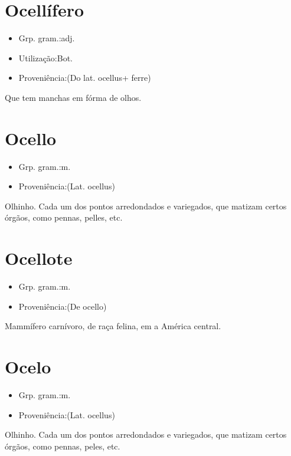\section{Ocellífero}
\begin{itemize}
\item {Grp. gram.:adj.}
\end{itemize}
\begin{itemize}
\item {Utilização:Bot.}
\end{itemize}
\begin{itemize}
\item {Proveniência:(Do lat. \textunderscore ocellus\textunderscore  + \textunderscore ferre\textunderscore )}
\end{itemize}
Que tem manchas em fórma de olhos.
\section{Ocello}
\begin{itemize}
\item {Grp. gram.:m.}
\end{itemize}
\begin{itemize}
\item {Proveniência:(Lat. \textunderscore ocellus\textunderscore )}
\end{itemize}
Olhinho.
Cada um dos pontos arredondados e variegados, que matizam certos órgãos, como pennas, pelles, etc.
\section{Ocellote}
\begin{itemize}
\item {Grp. gram.:m.}
\end{itemize}
\begin{itemize}
\item {Proveniência:(De \textunderscore ocello\textunderscore )}
\end{itemize}
Mammífero carnívoro, de raça felina, em a América central.
\section{Ocelo}
\begin{itemize}
\item {Grp. gram.:m.}
\end{itemize}
\begin{itemize}
\item {Proveniência:(Lat. \textunderscore ocellus\textunderscore )}
\end{itemize}
Olhinho.
Cada um dos pontos arredondados e variegados, que matizam certos órgãos, como pennas, peles, etc.
